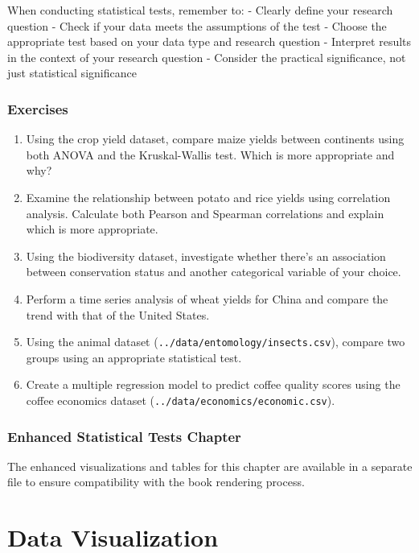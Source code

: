 \documentclass[
  letterpaper,
]{book}
\begin{document}
When conducting statistical tests, remember to: - Clearly define your
research question - Check if your data meets the assumptions of the test
- Choose the appropriate test based on your data type and research
question - Interpret results in the context of your research question -
Consider the practical significance, not just statistical significance

\section{Exercises}\label{exercises-4}

\begin{enumerate}
\def\labelenumi{\arabic{enumi}.}
\item
  Using the crop yield dataset, compare maize yields between continents
  using both ANOVA and the Kruskal-Wallis test. Which is more
  appropriate and why?
\item
  Examine the relationship between potato and rice yields using
  correlation analysis. Calculate both Pearson and Spearman correlations
  and explain which is more appropriate.
\item
  Using the biodiversity dataset, investigate whether there's an
  association between conservation status and another categorical
  variable of your choice.
\item
  Perform a time series analysis of wheat yields for China and compare
  the trend with that of the United States.
\item
  Using the animal dataset (\texttt{../data/entomology/insects.csv}),
  compare two groups using an appropriate statistical test.
\item
  Create a multiple regression model to predict coffee quality scores
  using the coffee economics dataset
  (\texttt{../data/economics/economic.csv}).
\end{enumerate}

\section{Enhanced Statistical Tests
Chapter}\label{enhanced-statistical-tests-chapter}

The enhanced visualizations and tables for this chapter are available in
a separate file to ensure compatibility with the book rendering process.

\part{Data Visualization}
\end{document}
